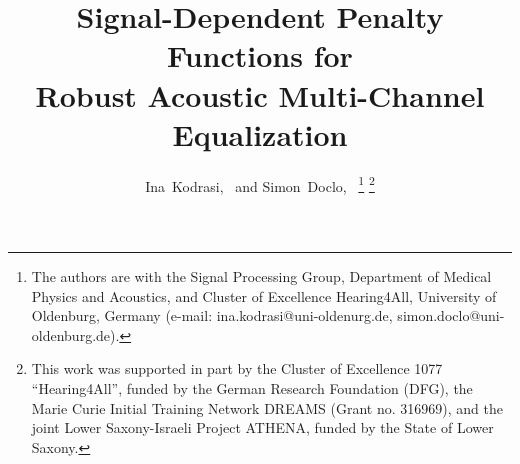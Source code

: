 \documentclass[10pt]{IEEEtran}
\begin{document}
\newlength\figureheight
\newlength\figurewidth
\setlength\figureheight{3.0cm}
\setlength{}

\title{Signal-Dependent Penalty Functions for \\ Robust Acoustic Multi-Channel Equalization}

\author{%
  Ina~Kodrasi,~ and Simon~Doclo,~
  \thanks{The authors are with the Signal Processing Group, Department of Medical Physics and Acoustics, and Cluster of Excellence Hearing4All, University of Oldenburg, Germany (e-mail: ina.kodrasi@uni-oldenurg.de, simon.doclo@uni-oldenburg.de).}%
  \thanks{
This work was supported in part by the Cluster of Excellence 1077 ``Hearing4All'', funded by the German Research Foundation (DFG), the Marie Curie Initial Training Network DREAMS (Grant no. 316969), and the joint Lower Saxony-Israeli Project ATHENA, funded by the State of Lower Saxony.
}
}
\maketitle
\newpage
\end{document}
